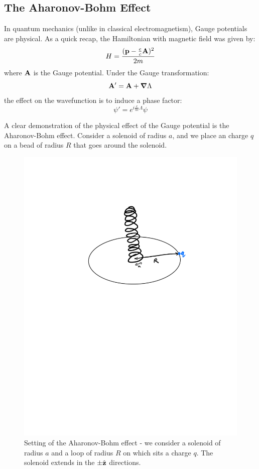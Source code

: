\subsection{The Aharonov-Bohm Effect}
In quantum mechanics (unlike in classical electromagnetism), Gauge potentials are physical. As a quick recap, the Hamiltonian with magnetic field was given by:
\begin{equation}
    H = \frac{(\mathbf{p} - \frac{e}{c}\mathbf{A})^2}{2m}
\end{equation} 
where $\mathbf{A}$ is the Gauge potential. Under the Gauge transformation:
\begin{equation}
    \v{A}' = \v{A} + \nabla \Lambda
\end{equation}
the effect on the wavefunction is to induce a phase factor:
\begin{equation}
    \psi' = e^{i\frac{e}{\hbar c}\Lambda}\psi
\end{equation}

A clear demonstration of the physical effect of the Gauge potential is the Aharonov-Bohm effect. Consider a solenoid of radius $a$, and we place an charge $q$ on a bead of radius $R$ that goes around the solenoid.

\begin{figure}[htbp]
    \centering
    \includegraphics[scale=0.6]{Images/fig-solenoid.pdf}
    \caption{Setting of the Aharonov-Bohm effect - we consider a solenoid of radius $a$ and a loop of radius $R$ on which sits a charge $q$. The solenoid extends in the $\pm \hat{\mathbf{z}}$ directions.}
    \label{fig-solenoid}
\end{figure}

